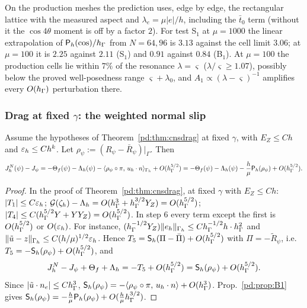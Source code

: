 On the production meshes the prediction uses, edge by edge, the rectangular lattice with the measured aspect and $\lambda_e=\mu|e|/h$, including the $\bar t_0$ term (without it the $\cos4\theta$ moment is off by a factor $2$). For test S$_1$ at $\mu=1000$ the linear extrapolation of $\mathsf P_h(\cos)/h_\Gamma$ from $N=64,96$ is $3.13$ against the cell limit $3.06$; at $\mu=100$ it is $2.25$ against $2.11$ (S$_1$) and $0.91$ against $0.84$ (B$_1$). At $\mu=100$ the production cells lie within $7\%$ of the resonance $\lambda=\varsigma$ ($\lambda/\varsigma\ge1.07$), possibly below the proved well-posedness range $\varsigma+\lambda_0$, and $A_1\propto(\lambda-\varsigma)^{-1}$ amplifies every $O(h_\Gamma)$ perturbation there.

\subsubsection{Drag at fixed $\gamma$: the weighted normal slip}
\begin{theorem}\label{pd:thm:B2}
Assume the hypotheses of Theorem~\ref{pd:thm:cnsdrag} at fixed $\gamma$, with $E_Z\le Ch$ and $\varepsilon_h\le Ch^k$. Let $\rho_\psi:=(R_\psi-\bar R_\psi)|_\Gamma$. Then
\[
J^N_h(\psi)-J_\psi=-\Theta_f(\psi)-\Lambda_h(\psi)-\langle \rho_\psi\circ\pi,\, u_h\cdot n\rangle_{\Gamma_h}+O(h_\Gamma^{5/2})
=-\Theta_f(\psi)-\Lambda_h(\psi)-\frac h\mu\mathsf P_h(\rho_\psi)+O(h_\Gamma^{5/2}).
\]
\end{theorem}

\begin{proof}
In the proof of Theorem~\ref{pd:thm:cnsdrag}, at fixed $\gamma$ with $E_Z\le Ch$: $|T_1|\le C\varepsilon_h$; $\mathcal G(\zeta_h)-\Lambda_h=O(h_\Gamma^3+h_\Gamma^{3/2}Y_Z)=O(h_\Gamma^{5/2})$; $|T_4|\le C(h_\Gamma^{5/2}Y+YY_Z)=O(h_\Gamma^{5/2})$. In step 6 every term except the first is $O(h_\Gamma^{5/2})$ or $O(\varepsilon_h)$. For instance, $(h_\Gamma^{-1/2}Y_Z)\lVert e_h\rVert_{\Gamma_h}\le Ch_\Gamma^{-1/2}h\cdot h_\Gamma^2$ and $\lVert \tilde u-z\rVert_{\Gamma_h}\le C(h/\mu)^{1/2}\varepsilon_h$. Hence $T_5=\mathsf S_h(\Pi-\bar\Pi)+O(h_\Gamma^{5/2})$ with $\Pi=-\tilde R_\psi$, i.e.\ $T_5=-\mathsf S_h(\rho_\psi)+O(h_\Gamma^{5/2})$, and
\[
J^N_h-J_\psi+\Theta_f+\Lambda_h=-T_5+O(h_\Gamma^{5/2})=\mathsf S_h(\rho_\psi)+O(h_\Gamma^{5/2}).
\]
Since $|\tilde u\cdot n_e|\le Ch_\Gamma^3$, $\mathsf S_h(\rho_\psi)=-\langle \rho_\psi\circ\pi,\, u_h\cdot n\rangle+O(h_\Gamma^3)$. Prop.~\ref{pd:prop:B1} gives $\mathsf S_h(\rho_\psi)=-\frac h\mu\mathsf P_h(\rho_\psi)+O(\frac h\mu h_\Gamma^{3/2})$.
\end{proof}

